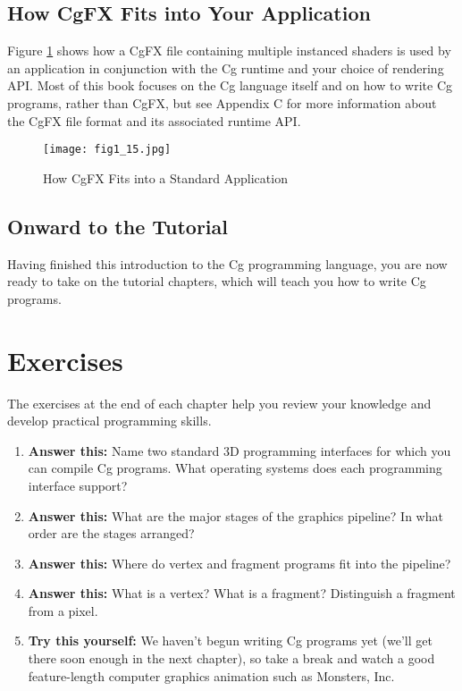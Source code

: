 \documentclass[../main.tex]{subfiles}
\begin{document}
\subsection*{How CgFX Fits into Your Application}

Figure \ref{fig:1-15} shows how a CgFX file containing multiple instanced shaders is used by an application in conjunction with the Cg runtime and your choice of rendering API. Most of this book focuses on the Cg language itself and on how to write Cg programs, rather than CgFX, but see Appendix C for more information about the CgFX file format and its associated runtime API.

\begin{figure}
    \centering
    \texttt{[image: fig1\_15.jpg]}
    \caption{How CgFX Fits into a Standard Application}
    \label{fig:1-15}
\end{figure}

\subsection*{Onward to the Tutorial}

Having finished this introduction to the Cg programming language, you are now ready to take on the tutorial chapters, which will teach you how to write Cg programs.

\section{Exercises}

The exercises at the end of each chapter help you review your knowledge and develop practical programming skills.

\FloatBarrier
\begin{enumerate}
    \item \textbf{Answer this:} Name two standard 3D programming interfaces for which you can compile Cg programs. What operating systems does each programming interface support?
    \item \textbf{Answer this:} What are the major stages of the graphics pipeline? In what order are the stages arranged?
    \item \textbf{Answer this:} Where do vertex and fragment programs fit into the pipeline?
    \item \textbf{Answer this:} What is a vertex? What is a fragment? Distinguish a fragment from a pixel.
    \item \textbf{Try this yourself:} We haven't begun writing Cg programs yet (we'll get there soon enough in the next chapter), so take a break and watch a good feature-length computer graphics animation such as Monsters, Inc.
\end{enumerate}
\FloatBarrier
\end{document}
